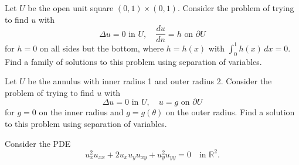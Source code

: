 \documentclass[12pt,fleqn,leqno]{exam}
\newcommand{\R}{\ensuremath{\mathbb{R}}}
\begin{document}
\begin{questions}

\question Let $U$ be the open unit square $(0,1) \times (0,1)$. Consider the problem of trying to find $u$ with
\[
\Delta u = 0 \text{ in $U$}, \quad
\frac{du}{dn} = h \text{ on $\partial U$}
\]
for $h = 0$ on all sides but the bottom, where $h = h(x)$ with $\int_0^1 h(x)\,dx = 0$. Find a family of solutions to this problem using separation of variables.

\question Let $U$ be the annulus with inner radius 1 and outer radius 2. Consider the problem of trying to find $u$ with
\[
\Delta u = 0 \text{ in $U$}, \quad
u = g \text{ on $\partial U$}
\]
for $g = 0$ on the inner radius and $g = g(\theta)$ on the outer radius. Find a solution to this problem using separation of variables.

\question Consider the PDE
\[u_x^2 u_{xx} + 2 u_x u_y u_{xy} + u_y^2 u_{yy} = 0 \quad \text{in $\R^2$}.\]


\end{questions}
\end{document}
